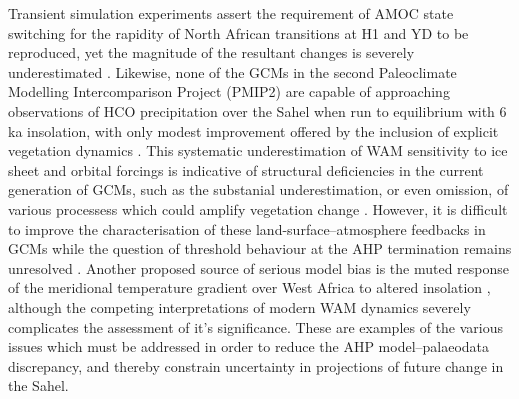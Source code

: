 \documentclass[a4paper]{article}
\begin{document}
Transient simulation experiments assert the requirement of AMOC state switching for the rapidity of North African transitions at H1 and YD to be reproduced, yet 
the magnitude of the resultant changes is severely underestimated \parencite{timm2010mechanisms, otto2014coherent}. 
Likewise, none of the GCMs in the second Paleoclimate Modelling Intercomparison Project (PMIP2) are capable of approaching observations of HCO precipitation over the Sahel when run to equilibrium with 6 ka insolation, with only modest improvement offered by the inclusion of explicit vegetation dynamics \parencite{braconnot2012evaluation, zheng2013characterization, harrison2015evaluation}.
This systematic underestimation of WAM sensitivity to ice sheet and orbital forcings is indicative of structural deficiencies in the current generation of GCMs, such as the substanial underestimation, or even omission, of various processess which could amplify vegetation change \parencite{tierney2017rainfall}.
However, it is difficult to improve the characterisation of these land-surface--atmosphere feedbacks in GCMs while the question of threshold behaviour at the AHP termination remains unresolved \parencite{claussen2017theory}. 
Another proposed source of serious model bias is the muted response of the meridional temperature gradient over West Africa to altered insolation \parencite{zheng2013characterization}, although the competing interpretations of modern WAM dynamics severely complicates the assessment of it's significance. 
These are examples of the various issues which must be addressed in order to reduce the AHP model--palaeodata discrepancy, and thereby constrain uncertainty in projections of future change in the Sahel.

\end{document}
